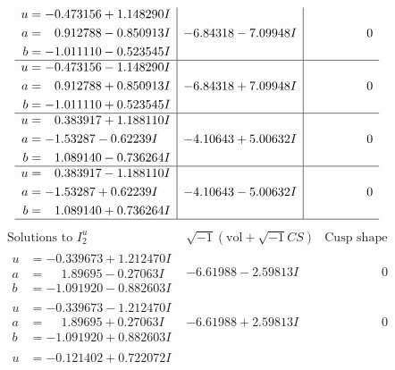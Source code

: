 \documentclass[1p]{elsarticle_modified}
\theoremstyle{definition}
\newcommand{\I}{\sqrt{-1}}
\begin{document}
$$\begin{array}{c|c|c}
\begin{aligned}
u &= -0.473156 + 1.148290 I \\
a &= \phantom{-}0.912788 - 0.850913 I \\
b &= -1.011110 - 0.523545 I\end{aligned}
 & -6.84318 - 7.09948 I & \phantom{-0.000000 } 0 \\ \hline\begin{aligned}
u &= -0.473156 - 1.148290 I \\
a &= \phantom{-}0.912788 + 0.850913 I \\
b &= -1.011110 + 0.523545 I\end{aligned}
 & -6.84318 + 7.09948 I & \phantom{-0.000000 } 0 \\ \hline\begin{aligned}
u &= \phantom{-}0.383917 + 1.188110 I \\
a &= -1.53287 - 0.62239 I \\
b &= \phantom{-}1.089140 - 0.736264 I\end{aligned}
 & -4.10643 + 5.00632 I & \phantom{-0.000000 } 0 \\ \hline\begin{aligned}
u &= \phantom{-}0.383917 - 1.188110 I \\
a &= -1.53287 + 0.62239 I \\
b &= \phantom{-}1.089140 + 0.736264 I\end{aligned}
 & -4.10643 - 5.00632 I & \phantom{-0.000000 } 0\\
 \hline 
 \end{array}$$\newpage$$\begin{array}{c|c|c}  
\text{Solutions to }I^u_{2}& \I (\text{vol} + \sqrt{-1}CS) & \text{Cusp shape}\\
 \hline 
\begin{aligned}
u &= -0.339673 + 1.212470 I \\
a &= \phantom{-}1.89695 - 0.27063 I \\
b &= -1.091920 - 0.882603 I\end{aligned}
 & -6.61988 - 2.59813 I & \phantom{-0.000000 } 0 \\ \hline\begin{aligned}
u &= -0.339673 - 1.212470 I \\
a &= \phantom{-}1.89695 + 0.27063 I \\
b &= -1.091920 + 0.882603 I\end{aligned}
 & -6.61988 + 2.59813 I & \phantom{-0.000000 } 0 \\ \hline\begin{aligned}
u &= -0.121402 + 0.722072 I \\

\end{aligned}
\end{array}$$
\end{document}
